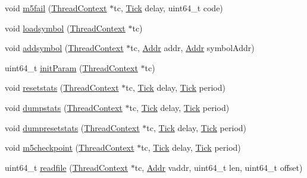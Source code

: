 \begin{DoxyCompactItemize}
\item 
void \hyperlink{namespacePseudoInst_a651838ae3cd047fdc85bd84e3f2215fd}{m5fail} (\hyperlink{classThreadContext}{ThreadContext} $\ast$tc, \hyperlink{base_2types_8hh_a5c8ed81b7d238c9083e1037ba6d61643}{Tick} delay, uint64\_\-t code)
\item 
void \hyperlink{namespacePseudoInst_ad8e4a9db66f5b7328670cca9f9549da4}{loadsymbol} (\hyperlink{classThreadContext}{ThreadContext} $\ast$tc)
\item 
void \hyperlink{namespacePseudoInst_a5a43d039916d7f4388d084bcc450162d}{addsymbol} (\hyperlink{classThreadContext}{ThreadContext} $\ast$tc, \hyperlink{base_2types_8hh_af1bb03d6a4ee096394a6749f0a169232}{Addr} addr, \hyperlink{base_2types_8hh_af1bb03d6a4ee096394a6749f0a169232}{Addr} symbolAddr)
\item 
uint64\_\-t \hyperlink{namespacePseudoInst_a9abf733144bf0f0e7b76fa3d7d18467b}{initParam} (\hyperlink{classThreadContext}{ThreadContext} $\ast$tc)
\item 
void \hyperlink{namespacePseudoInst_ac534c5c76b19579243916a2ab19064af}{resetstats} (\hyperlink{classThreadContext}{ThreadContext} $\ast$tc, \hyperlink{base_2types_8hh_a5c8ed81b7d238c9083e1037ba6d61643}{Tick} delay, \hyperlink{base_2types_8hh_a5c8ed81b7d238c9083e1037ba6d61643}{Tick} period)
\item 
void \hyperlink{namespacePseudoInst_a530073934a148e51b0274c3ebaa96f42}{dumpstats} (\hyperlink{classThreadContext}{ThreadContext} $\ast$tc, \hyperlink{base_2types_8hh_a5c8ed81b7d238c9083e1037ba6d61643}{Tick} delay, \hyperlink{base_2types_8hh_a5c8ed81b7d238c9083e1037ba6d61643}{Tick} period)
\item 
void \hyperlink{namespacePseudoInst_ac41c805ee58cc83abd878e49d9d9ff42}{dumpresetstats} (\hyperlink{classThreadContext}{ThreadContext} $\ast$tc, \hyperlink{base_2types_8hh_a5c8ed81b7d238c9083e1037ba6d61643}{Tick} delay, \hyperlink{base_2types_8hh_a5c8ed81b7d238c9083e1037ba6d61643}{Tick} period)
\item 
void \hyperlink{namespacePseudoInst_a276cb03befb21cde7ac21c6302533c01}{m5checkpoint} (\hyperlink{classThreadContext}{ThreadContext} $\ast$tc, \hyperlink{base_2types_8hh_a5c8ed81b7d238c9083e1037ba6d61643}{Tick} delay, \hyperlink{base_2types_8hh_a5c8ed81b7d238c9083e1037ba6d61643}{Tick} period)
\item 
uint64\_\-t \hyperlink{namespacePseudoInst_a8dff656222f96d2cba431e2486c19ff1}{readfile} (\hyperlink{classThreadContext}{ThreadContext} $\ast$tc, \hyperlink{base_2types_8hh_af1bb03d6a4ee096394a6749f0a169232}{Addr} vaddr, uint64\_\-t len, uint64\_\-t offset)

\end{DoxyCompactItemize}
